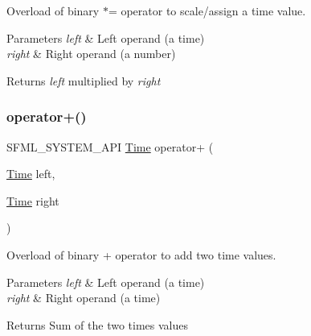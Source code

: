 Overload of binary $\ast$= operator to scale/assign a time value. 


\begin{DoxyParams}{Parameters}
{\em left} & Left operand (a time) \\
\hline
{\em right} & Right operand (a number)\\
\hline
\end{DoxyParams}
\begin{DoxyReturn}{Returns}
{\itshape left} multiplied by {\itshape right} \begin{DoxyVerb}\end{DoxyVerb}
 
\end{DoxyReturn}
\mbox{\label{classsf_1_1_time_a7155e965f238f8c32d63649b0189ef47}} 
\subsubsection{\texorpdfstring{operator+()}{operator+()}}
{\footnotesize\ttfamily S\+F\+M\+L\+\_\+\+S\+Y\+S\+T\+E\+M\+\_\+\+A\+PI \mbox{\hyperlink{classsf_1_1_time}{Time}} operator+ (\begin{DoxyParamCaption}\item[{\mbox{\hyperlink{classsf_1_1_time}{Time}}}]{left,  }\item[{\mbox{\hyperlink{classsf_1_1_time}{Time}}}]{right }\end{DoxyParamCaption})\hspace{0.3cm}{\ttfamily [related]}}



Overload of binary + operator to add two time values. 


\begin{DoxyParams}{Parameters}
{\em left} & Left operand (a time) \\
\hline
{\em right} & Right operand (a time)\\
\hline
\end{DoxyParams}
\begin{DoxyReturn}{Returns}
Sum of the two times values \begin{DoxyVerb}\end{DoxyVerb}
 
\end{DoxyReturn}
\mbox{\label{classsf_1_1_time_a831c8df4b7b9b47eaa0c5a52a1be654c}} 
